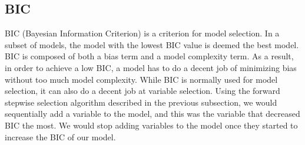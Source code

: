 \documentclass{article}
\begin{document}
\subsection{BIC}
BIC (Bayesian Information Criterion) is a criterion for model selection. In a subset of models, the model with the lowest BIC value is deemed the best model. BIC is composed of both a bias term and a model complexity term. As a result, in order to achieve a low BIC, a model has to do a decent job of minimizing bias without too much model complexity. While BIC is normally used for model selection, it can also do a decent job at variable selection. Using the forward stepwise selection algorithm
described in the previous subsection, we would sequentially add a variable to the model, and this was the variable that decreased BIC the most. We would stop adding variables to the model once they started to increase the BIC of our model.
\end{document}
